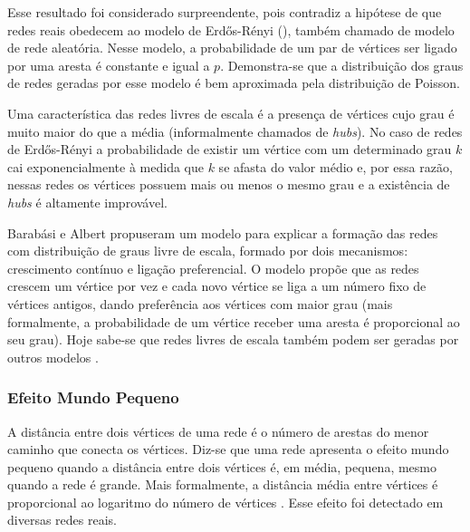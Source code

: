 ﻿\documentclass{article}
\begin{document}
Esse resultado foi considerado surpreendente, pois contradiz a hipótese de que redes reais obedecem ao modelo de Erdős-Rényi (\citeyear{Erdos1959}), também chamado de modelo de rede aleatória. Nesse modelo, a probabilidade de um par de vértices ser ligado por uma aresta é constante e igual a $p$. Demonstra-se que a distribuição dos graus de redes geradas por esse modelo é bem aproximada pela distribuição de Poisson.

Uma característica das redes livres de escala é a presença de vértices cujo grau é muito maior do que a média (informalmente chamados de \textit{hubs}). No caso de redes de Erdős-Rényi a probabilidade de existir um vértice com um determinado grau $k$ cai exponencialmente à medida que $k$ se afasta do valor médio e, por essa razão, nessas redes os vértices possuem mais ou menos o mesmo grau e a existência de \textit{hubs} é altamente improvável.

Barabási e Albert propuseram um modelo para explicar a formação das redes com distribuição de graus livre de escala, formado por dois mecanismos: crescimento contínuo e ligação preferencial. O modelo propõe que as redes crescem um vértice por vez e cada novo vértice se liga a um número fixo de vértices antigos, dando preferência aos vértices com maior grau (mais formalmente, a probabilidade de um vértice receber uma aresta é proporcional ao seu grau). Hoje sabe-se que redes livres de escala também podem ser geradas por outros modelos \cite{Albert2000,Kumar2000,Aiello2000b,Dorogovtsev2002,Bollobas2003,Deo2005}.


\subsubsection{Efeito Mundo Pequeno}

A distância entre dois vértices de uma rede é o número de arestas do menor caminho que conecta os vértices. Diz-se que uma rede apresenta o efeito mundo pequeno quando a distância entre dois vértices é, em média, pequena, mesmo quando a rede é grande. Mais formalmente, a distância média entre vértices é proporcional ao logaritmo do número de vértices \cite{Watts1998}. Esse efeito foi detectado em diversas redes reais.
\end{document}
